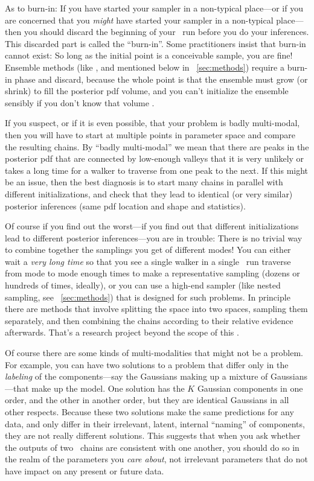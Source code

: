 \documentclass[modern]{aastex61}
\newcommand{\MCMC}{\acronym{MCMC}}
\begin{document}
As to burn-in:
If you have started your sampler in a non-typical place---or if you
are concerned that you \emph{might} have started your sampler in a
non-typical place---then you should discard the beginning of your
\MCMC\ run before you do your inferences.
This discarded part is called the ``burn-in''.
Some practitioners insist that burn-in cannot exist: So long as the initial point is a conceivable
sample, you are fine!
Ensemble methods (like , and
mentioned below in \sectionname~\ref{sec:methods}) require a burn-in
phase and discard, because the whole point is that the ensemble must
grow (or shrink) to fill the posterior pdf volume, and you can't
initialize the ensemble sensibly if you don't know that volume
.

If you suspect, or if it is even possible, that your problem is badly
multi-modal, then you will have to start at multiple points in
parameter space and compare the resulting chains.
By ``badly multi-modal'' we mean that there are peaks in the posterior
pdf that are connected by low-enough valleys that it is very unlikely
or takes a long time for a walker to traverse from one peak to the
next.
If this might be an issue, then the best diagnosis is to start many
chains in parallel with different initializations,
  and check that they lead to identical (or very
similar) posterior inferences (same pdf location and shape and
statistics).

Of course if you find out the worst---if you find out that different
initializations lead to different posterior inferences---you are in
trouble:
There is no trivial way to combine together the samplings you get of
different modes!
You can either wait a \emph{very long time} so that you see a single
walker in a single \MCMC\ run traverse from mode to mode enough times to
make a representative sampling (dozens or hundreds of times, ideally),
or you can use a high-end sampler (like nested sampling, see \sectionname~\ref{sec:methods}) that is
designed for such problems.
In principle there are methods that involve splitting the space into
two spaces, sampling them separately, and then combining the chains
according to their relative evidence afterwards.
That's a research project beyond the scope of this \documentname.

Of course there are some kinds of multi-modalities that might not be a
problem.
For example, you can have two solutions to a problem that differ only
in the \emph{labeling} of the components---say the Gaussians making up
a mixture of Gaussians---that make up the model.
One solution has the $K$ Gaussian components in one order, and the
other in another order, but they are identical Gaussians in all
other respects.
Because these two solutions make the same predictions for any data, and
only differ in their irrelevant, latent, internal ``naming'' of components,
they are not really different solutions.
This suggests that when you ask whether the outputs of two \MCMC\ chains
are consistent with one another, you should do so in the realm of the
parameters you \emph{care about}, not irrelevant parameters that do
not have impact on any present or future data.
\end{document}

